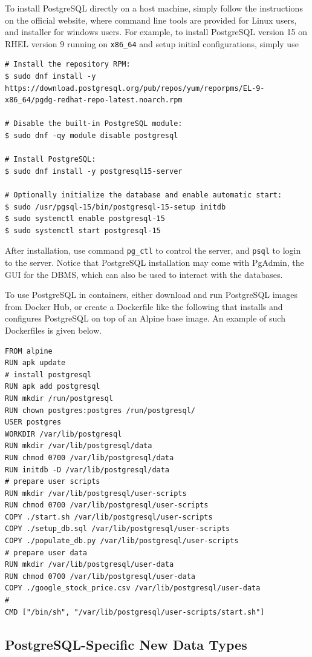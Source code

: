 To install PostgreSQL directly on a host machine, simply follow the instructions on the official website, where command line tools are provided for Linux users, and installer for windows users. For example, to install PostgreSQL version 15 on RHEL version 9 running on \verb|x86_64| and setup initial configurations, simply use
\begin{lstlisting}
# Install the repository RPM:
$ sudo dnf install -y https://download.postgresql.org/pub/repos/yum/reporpms/EL-9-x86_64/pgdg-redhat-repo-latest.noarch.rpm

# Disable the built-in PostgreSQL module:
$ sudo dnf -qy module disable postgresql

# Install PostgreSQL:
$ sudo dnf install -y postgresql15-server

# Optionally initialize the database and enable automatic start:
$ sudo /usr/pgsql-15/bin/postgresql-15-setup initdb
$ sudo systemctl enable postgresql-15
$ sudo systemctl start postgresql-15
\end{lstlisting}

After installation, use command \verb|pg_ctl| to control the server, and \verb|psql| to login to the server. Notice that PostgreSQL installation may come with PgAdmin, the GUI for the DBMS, which can also be used to interact with the databases.

To use PostgreSQL in containers, either download and run PostgreSQL images from Docker Hub, or create a Dockerfile like the following that installs and configures PostgreSQL on top of an Alpine base image. An example of such Dockerfiles is given below.
\begin{lstlisting}
FROM alpine
RUN apk update
# install postgresql
RUN apk add postgresql
RUN mkdir /run/postgresql
RUN chown postgres:postgres /run/postgresql/
USER postgres
WORKDIR /var/lib/postgresql
RUN mkdir /var/lib/postgresql/data
RUN chmod 0700 /var/lib/postgresql/data
RUN initdb -D /var/lib/postgresql/data
# prepare user scripts
RUN mkdir /var/lib/postgresql/user-scripts
RUN chmod 0700 /var/lib/postgresql/user-scripts
COPY ./start.sh /var/lib/postgresql/user-scripts
COPY ./setup_db.sql /var/lib/postgresql/user-scripts
COPY ./populate_db.py /var/lib/postgresql/user-scripts
# prepare user data
RUN mkdir /var/lib/postgresql/user-data
RUN chmod 0700 /var/lib/postgresql/user-data
COPY ./google_stock_price.csv /var/lib/postgresql/user-data
#
CMD ["/bin/sh", "/var/lib/postgresql/user-scripts/start.sh"]
\end{lstlisting}


\subsection{PostgreSQL-Specific New Data Types}

